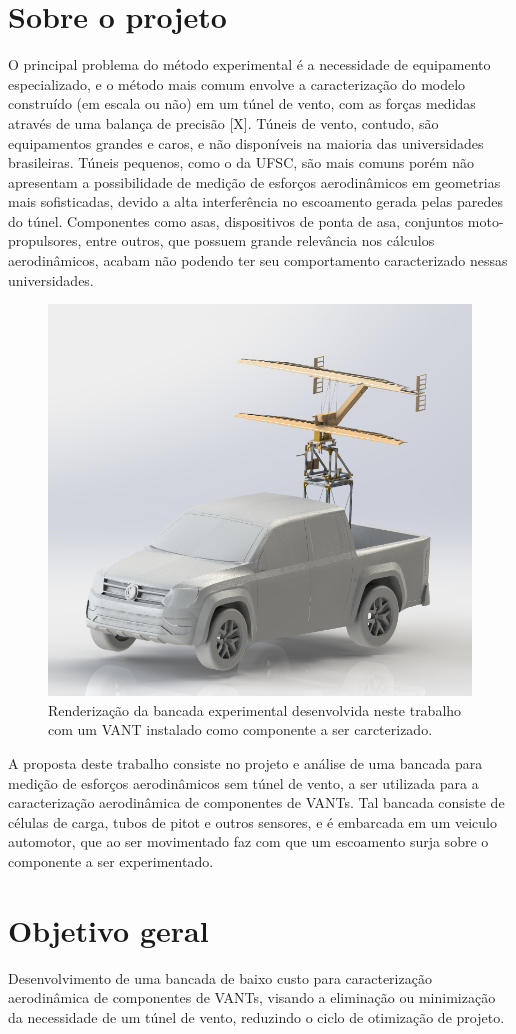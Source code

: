 \section{Sobre o projeto}

O principal problema do método experimental é a necessidade de equipamento especializado, e o método mais comum envolve a caracterização do modelo construído (em escala ou não) em um túnel de vento, com as forças medidas através de uma balança de precisão [X]. Túneis de vento, contudo, são equipamentos grandes e caros, e não disponíveis na maioria das universidades brasileiras. Túneis pequenos, como o da UFSC, são mais comuns porém não apresentam a possibilidade de medição de esforços aerodinâmicos em geometrias mais sofisticadas, devido a alta interferência no escoamento gerada pelas paredes do túnel. Componentes como asas, dispositivos de ponta de asa, conjuntos moto-propulsores, entre outros, que possuem grande relevância nos cálculos aerodinâmicos, acabam não podendo ter seu comportamento caracterizado nessas universidades.

\begin{figure}[!ht]
    \centering
    \includegraphics[width=.8\linewidth]{figuras/renders/aviao_no_carro.png}
    \caption{Renderização da bancada experimental desenvolvida neste trabalho com um VANT instalado como componente a ser carcterizado\cite{autor}.}
    \label{fig:render_bancada_aviao_carro}
\end{figure}

A proposta deste trabalho consiste no projeto e análise de uma bancada para medição de esforços aerodinâmicos sem túnel de vento, a ser utilizada para a caracterização aerodinâmica de componentes de VANTs. Tal bancada consiste de células de carga, tubos de pitot e outros sensores, e é embarcada em um veiculo automotor, que ao ser movimentado faz com que um escoamento surja sobre o componente a ser experimentado.

\section{Objetivo geral}

Desenvolvimento de uma bancada de baixo custo para caracterização aerodinâmica de componentes de VANTs, visando a eliminação ou minimização da necessidade de um túnel de vento, reduzindo o ciclo de otimização de projeto.
